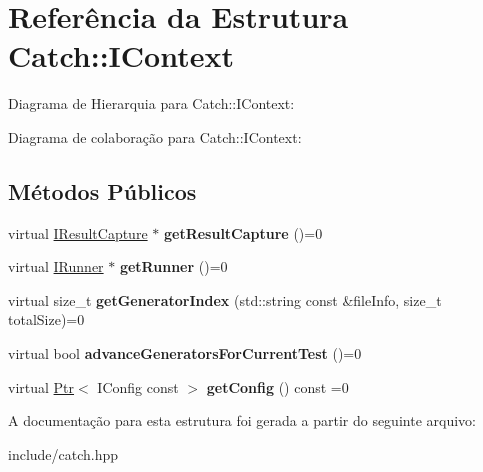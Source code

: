 \hypertarget{structCatch_1_1IContext}{}\section{Referência da Estrutura Catch\+:\+:I\+Context}
\label{structCatch_1_1IContext}


Diagrama de Hierarquia para Catch\+:\+:I\+Context\+:


Diagrama de colaboração para Catch\+:\+:I\+Context\+:
\subsection*{Métodos Públicos}
\begin{DoxyCompactItemize}
\item 
virtual \hyperlink{structCatch_1_1IResultCapture}{I\+Result\+Capture} $\ast$ {\bfseries get\+Result\+Capture} ()=0\hypertarget{structCatch_1_1IContext_a684e4ae71d1fdf3060c352ecde1d122f}{}\label{structCatch_1_1IContext_a684e4ae71d1fdf3060c352ecde1d122f}

\item 
virtual \hyperlink{structCatch_1_1IRunner}{I\+Runner} $\ast$ {\bfseries get\+Runner} ()=0\hypertarget{structCatch_1_1IContext_af088415dde18d039ed5a2f95b02767c6}{}\label{structCatch_1_1IContext_af088415dde18d039ed5a2f95b02767c6}

\item 
virtual size\+\_\+t {\bfseries get\+Generator\+Index} (std\+::string const \&file\+Info, size\+\_\+t total\+Size)=0\hypertarget{structCatch_1_1IContext_a43e07088db43299ba129fbe6d3106e95}{}\label{structCatch_1_1IContext_a43e07088db43299ba129fbe6d3106e95}

\item 
virtual bool {\bfseries advance\+Generators\+For\+Current\+Test} ()=0\hypertarget{structCatch_1_1IContext_a806f7c4ed24d51adae90418e661b24b7}{}\label{structCatch_1_1IContext_a806f7c4ed24d51adae90418e661b24b7}

\item 
virtual \hyperlink{classCatch_1_1Ptr}{Ptr}$<$ I\+Config const  $>$ {\bfseries get\+Config} () const =0\hypertarget{structCatch_1_1IContext_aee81c415899262e096ad8d6f686fa365}{}\label{structCatch_1_1IContext_aee81c415899262e096ad8d6f686fa365}

\end{DoxyCompactItemize}


A documentação para esta estrutura foi gerada a partir do seguinte arquivo\+:\begin{DoxyCompactItemize}
\item 
include/catch.\+hpp\end{DoxyCompactItemize}

